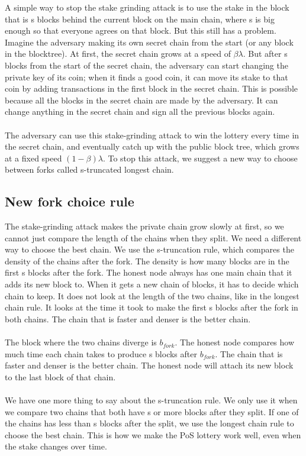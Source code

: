 A simple way to stop the stake grinding attack is to use the stake in the block that is s blocks behind the current block on the main chain, where s is big enough so that everyone agrees on that block. But this still has a problem. Imagine the adversary making its own secret chain from the start (or any block in the blocktree). At first, the secret chain grows at a speed of $\beta\lambda$. But after s blocks from the start of the secret chain, the adversary can start changing the private key of its coin; when it finds a good coin, it can move its stake to that coin by adding transactions in the first block in the secret chain. This is possible because all the blocks in the secret chain are made by the adversary. It can change anything in the secret chain and sign all the previous blocks again.\\\\
The adversary can use this stake-grinding attack to win the lottery every time in the secret chain, and eventually catch up with the public block tree, which grows at a fixed speed $(1 - \beta)\lambda$. To stop this attack, we suggest a new way to choose between forks called s-truncated longest chain.

\subsection{New fork choice rule}
The stake-grinding attack makes the private chain grow slowly at first, so we cannot just compare the length of the chains when they split. We need a different way to choose the best chain. We use the s-truncation rule, which compares the density of the chains after the fork. The density is how many blocks are in the first s blocks after the fork. The honest node always has one main chain that it adds its new block to. When it gets a new chain of blocks, it has to decide which chain to keep. It does not look at the length of the two chains, like in the longest chain rule. It looks at the time it took to make the first s blocks after the fork in both chains. The chain that is faster and denser is the better chain.\\\\
The block where the two chains diverge is $b_{fork}$. The honest node compares how much time each chain takes to produce s blocks after $b_{fork}$. The chain that is faster and denser is the better chain. The honest node will attach its new block to the last block of that chain.\\\\
We have one more thing to say about the s-truncation rule. We only use it when we compare two chains that both have s or more blocks after they split. If one of the chains has less than s blocks after the split, we use the longest chain rule to choose the best chain. This is how we make the PoS lottery work well, even when the stake changes over time.

